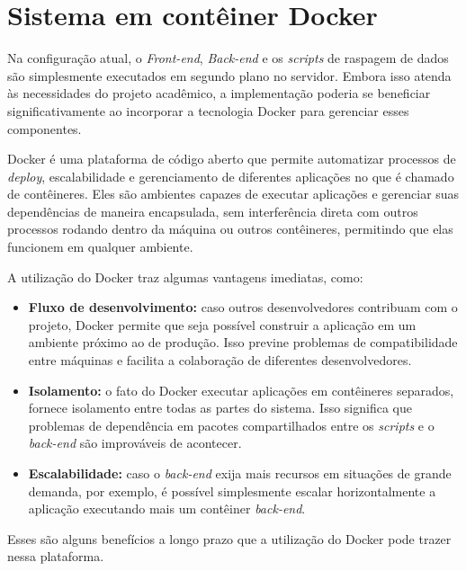 \section{Sistema em contêiner Docker}

Na configuração atual, o \textit{Front-end}, \textit{Back-end} e os
\textit{scripts} de raspagem de dados são simplesmente executados em segundo
plano no servidor. Embora isso atenda às necessidades do projeto acadêmico, a
implementação poderia se beneficiar significativamente ao incorporar a
tecnologia Docker para gerenciar esses componentes.

Docker é uma plataforma de código aberto que permite automatizar processos de
\textit{deploy}, escalabilidade e gerenciamento de diferentes aplicações no que
é chamado de contêineres. Eles são ambientes capazes de executar aplicações e
gerenciar suas dependências de maneira encapsulada, sem interferência direta
com outros processos rodando dentro da máquina ou outros contêineres,
permitindo que elas funcionem em qualquer ambiente.

A utilização do Docker traz algumas vantagens imediatas, como:
\begin{itemize}
    \item \textbf{Fluxo de desenvolvimento:} caso outros desenvolvedores contribuam com o projeto, Docker permite que seja possível construir a aplicação em um ambiente próximo ao de produção. Isso previne problemas de compatibilidade entre máquinas e facilita a colaboração de diferentes desenvolvedores.

    \item \textbf{Isolamento:} o fato do Docker executar aplicações em contêineres separados, fornece isolamento entre todas as partes do sistema. Isso significa que problemas de dependência em pacotes compartilhados entre os \textit{scripts} e o \textit{back-end} são improváveis de acontecer.

    \item \textbf{Escalabilidade:} caso o \textit{back-end} exija mais recursos em situações de grande demanda, por exemplo, é possível simplesmente escalar horizontalmente a aplicação executando mais um contêiner \textit{back-end}.
\end{itemize}

Esses são alguns benefícios a longo prazo que a utilização do Docker pode
trazer nessa plataforma.